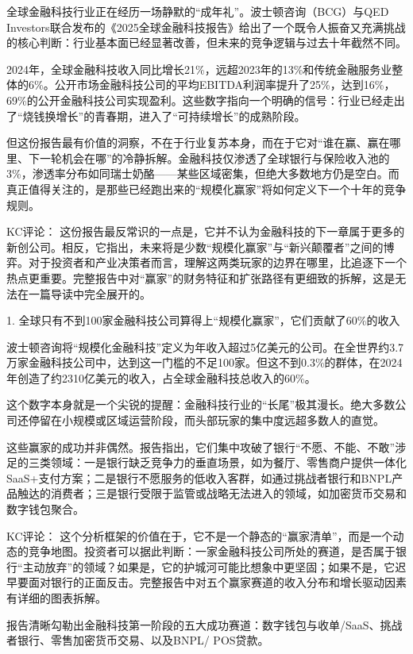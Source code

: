 \documentclass[11pt]{ctexart}
\begin{document}
全球金融科技行业正在经历一场静默的“成年礼”。波士顿咨询（BCG）与QED Investors联合发布的《2025全球金融科技报告》给出了一个既令人振奋又充满挑战的核心判断：行业基本面已经显著改善，但未来的竞争逻辑与过去十年截然不同。

2024年，全球金融科技收入同比增长21\%，远超2023年的13\%和传统金融服务业整体的6\%。公开市场金融科技公司的平均EBITDA利润率提升了25\%，达到16\%，69\%的公开金融科技公司实现盈利。这些数字指向一个明确的信号：行业已经走出了“烧钱换增长”的青春期，进入了“可持续增长”的成熟阶段。

但这份报告最有价值的洞察，不在于行业复苏本身，而在于它对“谁在赢、赢在哪里、下一轮机会在哪”的冷静拆解。金融科技仅渗透了全球银行与保险收入池的3\%，渗透率分布如同瑞士奶酪——某些区域密集，但绝大多数地方仍是空白。而真正值得关注的，是那些已经跑出来的“规模化赢家”将如何定义下一个十年的竞争规则。

KC评论： 这份报告最反常识的一点是，它并不认为金融科技的下一章属于更多的新创公司。相反，它指出，未来将是少数“规模化赢家”与“新兴颠覆者”之间的博弈。对于投资者和产业决策者而言，理解这两类玩家的边界在哪里，比追逐下一个热点更重要。完整报告中对“赢家”的财务特征和扩张路径有更细致的拆解，这是无法在一篇导读中完全展开的。

1. 全球只有不到100家金融科技公司算得上“规模化赢家”，它们贡献了60\%的收入

波士顿咨询将“规模化金融科技”定义为年收入超过5亿美元的公司。在全世界约3.7万家金融科技公司中，达到这一门槛的不足100家。但这不到0.3\%的群体，在2024年创造了约2310亿美元的收入，占全球金融科技总收入的60\%。

这个数字本身就是一个尖锐的提醒：金融科技行业的“长尾”极其漫长。绝大多数公司还停留在小规模或区域运营阶段，而头部玩家的集中度远超多数人的直觉。

这些赢家的成功并非偶然。报告指出，它们集中攻破了银行“不愿、不能、不敢”涉足的三类领域：一是银行缺乏竞争力的垂直场景，如为餐厅、零售商户提供一体化SaaS+支付方案；二是银行不愿服务的低收入客群，如通过挑战者银行和BNPL产品触达的消费者；三是银行受限于监管或战略无法进入的领域，如加密货币交易和数字钱包聚合。

KC评论： 这个分析框架的价值在于，它不是一个静态的“赢家清单”，而是一个动态的竞争地图。投资者可以据此判断：一家金融科技公司所处的赛道，是否属于银行“主动放弃”的领域？如果是，它的护城河可能比想象中更坚固；如果不是，它迟早要面对银行的正面反击。完整报告中对五个赢家赛道的收入分布和增长驱动因素有详细的图表拆解。

报告清晰勾勒出金融科技第一阶段的五大成功赛道：数字钱包与收单/SaaS、挑战者银行、零售加密货币交易、以及BNPL/ POS贷款。
\end{document}
